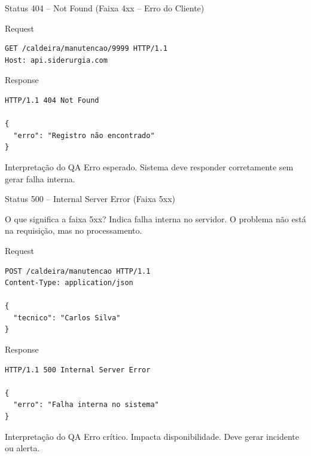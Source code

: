 \documentclass[9pt]{beamer}
\begin{document}
\begin{frame}[fragile]{Status 404 – Not Found (Faixa 4xx – Erro do Cliente)}


\begin{block}{Request}
\begin{verbatim}
GET /caldeira/manutencao/9999 HTTP/1.1
Host: api.siderurgia.com
\end{verbatim}
\end{block}

\begin{block}{Response}
\begin{verbatim}
HTTP/1.1 404 Not Found

{
  "erro": "Registro não encontrado"
}
\end{verbatim}
\end{block}

\begin{block}{Interpretação do QA}
Erro esperado.
Sistema deve responder corretamente
sem gerar falha interna.
\end{block}

\end{frame}
\begin{frame}[fragile]{Status 500 – Internal Server Error (Faixa 5xx)}
\begin{block}{O que significa a faixa 5xx?}
Indica falha interna no servidor.
O problema não está na requisição,
mas no processamento.
\end{block}
\begin{block}{Request}
\begin{verbatim}
POST /caldeira/manutencao HTTP/1.1
Content-Type: application/json

{
  "tecnico": "Carlos Silva"
}
\end{verbatim}
\end{block}

\begin{block}{Response}
\begin{verbatim}
HTTP/1.1 500 Internal Server Error

{
  "erro": "Falha interna no sistema"
}
\end{verbatim}
\end{block}

\begin{block}{Interpretação do QA}
Erro crítico.
Impacta disponibilidade.
Deve gerar incidente ou alerta.
\end{block}

\end{frame}
\end{document}
